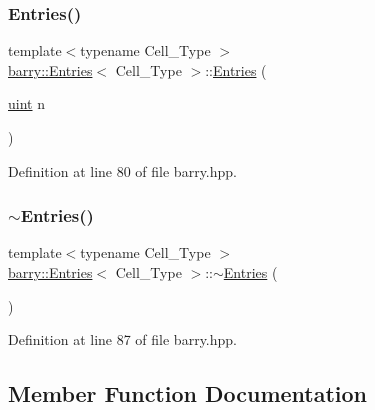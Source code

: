\subsubsection{\texorpdfstring{Entries()}{Entries()}\hspace{0.1cm}{\footnotesize\ttfamily [2/2]}}
{\footnotesize\ttfamily template$<$typename Cell\+\_\+\+Type $>$ \\
\hyperlink{classbarry_1_1_entries}{barry\+::\+Entries}$<$ Cell\+\_\+\+Type $>$\+::\hyperlink{classbarry_1_1_entries}{Entries} (\begin{DoxyParamCaption}\item[{\hyperlink{namespacebarry_a11dfc53ddb4672278319aa04f1e09a6c}{uint}}]{n }\end{DoxyParamCaption})\hspace{0.3cm}{\ttfamily [inline]}}



Definition at line 80 of file barry.\+hpp.

\mbox{\label{classbarry_1_1_entries_a8d74af4d3b545fb79f9f4e8e894160cb}} 
\subsubsection{\texorpdfstring{$\sim$\+Entries()}{~Entries()}}
{\footnotesize\ttfamily template$<$typename Cell\+\_\+\+Type $>$ \\
\hyperlink{classbarry_1_1_entries}{barry\+::\+Entries}$<$ Cell\+\_\+\+Type $>$\+::$\sim$\hyperlink{classbarry_1_1_entries}{Entries} (\begin{DoxyParamCaption}{ }\end{DoxyParamCaption})\hspace{0.3cm}{\ttfamily [inline]}}



Definition at line 87 of file barry.\+hpp.



\subsection{Member Function Documentation}
\mbox{\label{classbarry_1_1_entries_a0c1e6fb0a6e2c462ba782433ac11e026}} 
